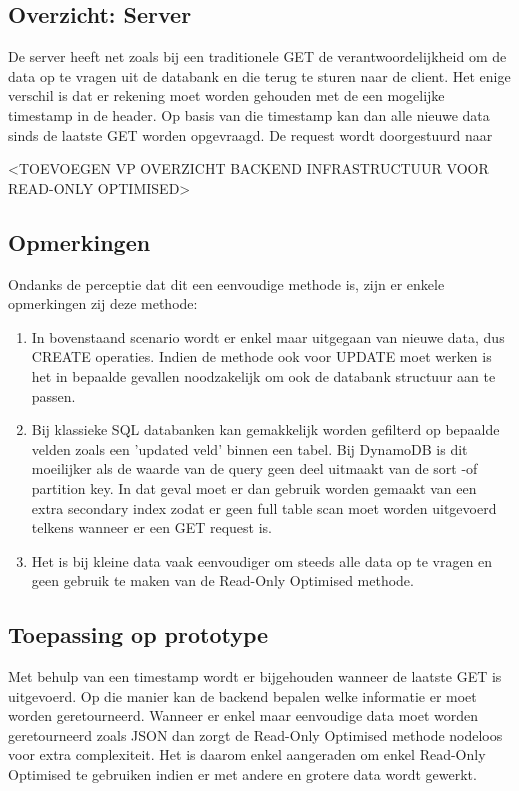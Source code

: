 \subsection{Overzicht: Server}
De server heeft net zoals bij een traditionele GET de verantwoordelijkheid om de data op te vragen uit de databank en die terug te sturen naar de client. Het enige verschil is dat er rekening moet worden gehouden met de een mogelijke timestamp in de header. Op basis van die timestamp kan dan alle nieuwe data sinds de laatste GET worden opgevraagd. De request wordt doorgestuurd naar 

<TOEVOEGEN VP OVERZICHT BACKEND INFRASTRUCTUUR VOOR READ-ONLY OPTIMISED>

\subsection{Opmerkingen}
Ondanks de perceptie dat dit een eenvoudige methode is, zijn er enkele opmerkingen zij deze methode:
\begin{enumerate}
\item In bovenstaand scenario wordt er enkel maar uitgegaan van nieuwe data, dus CREATE operaties. Indien de methode ook voor UPDATE moet werken is het in bepaalde gevallen noodzakelijk om ook de databank structuur aan te passen.
\item Bij klassieke SQL databanken kan gemakkelijk worden gefilterd op bepaalde velden zoals een 'updated veld' binnen een tabel. Bij DynamoDB is dit moeilijker als de waarde van de query geen deel uitmaakt van de sort -of partition key. In dat geval moet er dan gebruik worden gemaakt van een extra secondary index zodat er geen full table scan moet worden uitgevoerd telkens wanneer er een GET request is.
\item Het is bij kleine data vaak eenvoudiger om steeds alle data op te vragen en geen gebruik te maken van de Read-Only Optimised methode.
\end{enumerate}
\subsection{Toepassing op prototype}
Met behulp van een timestamp wordt er bijgehouden wanneer de laatste GET is uitgevoerd. Op die manier kan de backend bepalen welke informatie er moet worden geretourneerd. Wanneer er enkel maar eenvoudige data moet worden geretourneerd zoals JSON dan zorgt de Read-Only Optimised methode nodeloos voor extra complexiteit. Het is daarom enkel aangeraden om enkel Read-Only Optimised te gebruiken indien er met andere en grotere data wordt gewerkt.
